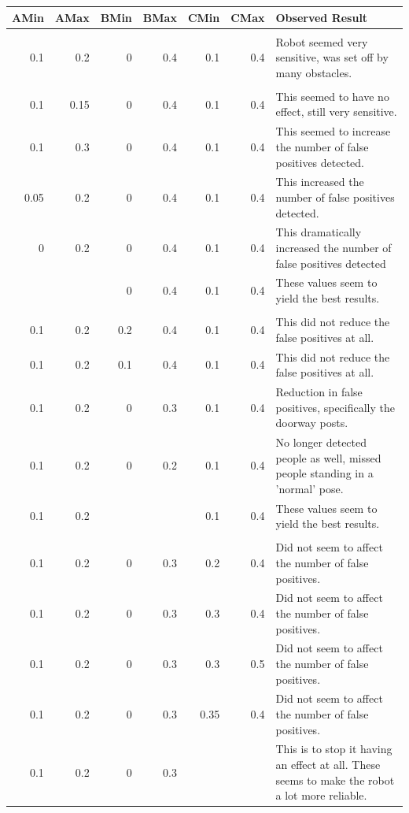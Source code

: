 \documentclass{article}
\newcommand{\bftab}{\fontseries{b}\selectfont}
\begin{document}
\begin{supertabular}{r|r|r|r|r|r|p{8cm}}
AMin & AMax & BMin & BMax & CMin & CMax & Observed Result\\
\hline
 & & & & & & \\

0.1 & 0.2 & 0 & 0.4 & 0.1 & 0.4 & Robot seemed very sensitive, was set off by many obstacles.\\

 & & & & & & \\
 0.1 & 0.15 & 0 & 0.4 & 0.1 & 0.4 & This seemed to have no effect, still very sensitive.\\[1ex]
 0.1 & 0.3 & 0 & 0.4 & 0.1 & 0.4 & This seemed to increase the number of false positives detected.\\
 0.05 & 0.2 & 0 & 0.4 & 0.1 & 0.4 & This increased the number of false positives detected.\\[1ex]
 0 & 0.2 & 0 & 0.4 & 0.1 & 0.4 & This dramatically increased the number of false positives detected\\
 \bftab 0.1 & \bftab 0.2 & 0 & 0.4 & 0.1 & 0.4 & These values seem to yield the best results.\\ [1ex]
 & & & & & & \\ 
 0.1 & 0.2 & 0.2 & 0.4 & 0.1 & 0.4 & This did not reduce the false positives at all.\\[1ex]
 0.1 & 0.2 & 0.1 & 0.4 & 0.1 & 0.4 & This did not reduce the false positives at all.\\[1ex]
 0.1 & 0.2 & 0 & 0.3 & 0.1 & 0.4 & Reduction in false positives, specifically the doorway posts.\\
 0.1 & 0.2 & 0 & 0.2 & 0.1 & 0.4 & No longer detected people as well, missed people standing in a 'normal' pose.\\
 0.1 & 0.2 & \bftab 0 & \bftab 0.3 & 0.1 & 0.4 & These values seem to yield the best results.\\ [1ex]
 & & & & & & \\
 0.1 & 0.2 & 0 & 0.3 & 0.2 & 0.4 & Did not seem to affect the number of false positives.\\[1ex]
 0.1 & 0.2 & 0 & 0.3 & 0.3 & 0.4 & Did not seem to affect the number of false positives.\\[1ex]
 0.1 & 0.2 & 0 & 0.3 & 0.3 & 0.5 & Did not seem to affect the number of false positives.\\[1ex]
 0.1 & 0.2 & 0 & 0.3 & 0.35 & 0.4 & Did not seem to affect the number of false positives.\\[1ex]
 
 0.1 & 0.2 & 0 & 0.3 & \bftab 1000 & \bftab 1000 & This is to stop it having an effect at all. These seems to make the robot a lot more reliable.\\
 \end{supertabular}
 \vspace{0.2cm}
 
\end{document}
